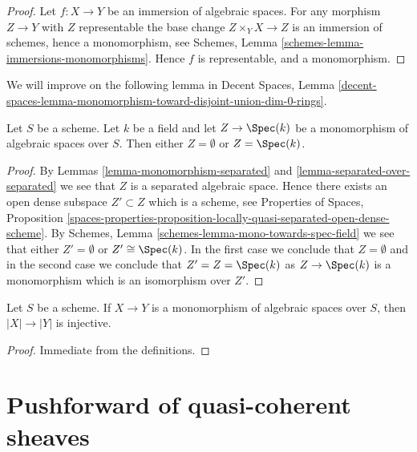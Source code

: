 \begin{proof}
Let $f : X \to Y$ be an immersion of algebraic spaces.
For any morphism $Z \to Y$ with $Z$ representable the base
change $Z \times_Y X \to Z$ is an immersion of schemes, hence
a monomorphism, see
Schemes, Lemma \ref{schemes-lemma-immersions-monomorphisms}.
Hence $f$ is representable, and a monomorphism.
\end{proof}

\noindent
We will improve on the following lemma in
Decent Spaces, Lemma
\ref{decent-spaces-lemma-monomorphism-toward-disjoint-union-dim-0-rings}.

\begin{lemma}
\label{lemma-monomorphism-toward-field}
Let $S$ be a scheme. Let $k$ be a field and let $Z \to \Spec(k)$
be a monomorphism of algebraic spaces over $S$. Then either
$Z = \emptyset$ or $Z = \Spec(k)$.
\end{lemma}

\begin{proof}
By
Lemmas \ref{lemma-monomorphism-separated} and
\ref{lemma-separated-over-separated}
we see that $Z$ is a separated algebraic space. Hence there exists an
open dense subspace $Z' \subset Z$ which is a scheme, see
Properties of Spaces, Proposition
\ref{spaces-properties-proposition-locally-quasi-separated-open-dense-scheme}.
By
Schemes, Lemma \ref{schemes-lemma-mono-towards-spec-field}
we see that either $Z' = \emptyset$ or $Z' \cong \Spec(k)$.
In the first case we conclude that $Z = \emptyset$ and in the
second case we conclude that $Z' = Z = \Spec(k)$
as $Z \to \Spec(k)$ is a monomorphism which is an
isomorphism over $Z'$.
\end{proof}

\begin{lemma}
\label{lemma-monomorphism-injective-points}
Let $S$ be a scheme. If $X \to Y$ is a monomorphism of algebraic spaces
over $S$, then $|X| \to |Y|$ is injective.
\end{lemma}

\begin{proof}
Immediate from the definitions.
\end{proof}















\section{Pushforward of quasi-coherent sheaves}
\label{section-pushforward}

